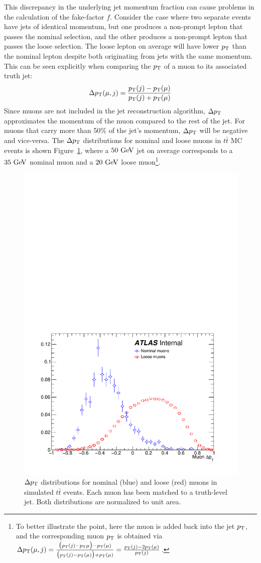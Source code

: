 This discrepancy in the underlying jet momentum fraction can cause problems in the calculation of the fake-factor $f$.
Consider the case where two separate events have jets of identical momentum, but one produces a non-prompt lepton that passes the nominal selection, and the other produces a non-prompt lepton that passes the loose selection.
The loose lepton on average will have lower $p_{\mathrm{T}}$ than the nominal lepton despite both originating from jets with the same momentum.
This can be seen explicitly when comparing the $p_{\mathrm{T}}$ of a muon to its associated truth jet:
\begin{equation}
\Delta\pt(\mu,j) = \frac{\pt(j)-\pt(\mu)}{\pt(j)+\pt(\mu)}
\label{eq:ssww13tev_ff_deltapt}
\end{equation}
Since muons are not included in the jet reconstruction algorithm, $\Delta p_{\mathrm{T}}$ approximates the momentum of the muon compared to the rest of the jet.
For muons that carry more than 50\% of the jet's momentum, $\Delta p_{\mathrm{T}}$ will be negative and vice-versa.
The $\Delta p_{\mathrm{T}}$ distributions for nominal and loose muons in $t\bar{t}$ MC events is shown Figure~\ref{fig:ssww13tev_ff_deltapt}, where a $50\gev$ jet on average corresponds to a $35\gev$ nominal muon and a $20\gev$ loose muon\footnote{To better illustrate the point, here the muon is added back into the jet $p_{\mathrm{T}}$, and the corresponding muon $p_{\mathrm{T}}$ is obtained via $\Delta p_{\mathrm{T}}(\mu,j) = \frac{\big(p_{\mathrm{T}}(j)-p_{\mathrm{T}}{\mu}\big)-p_{\mathrm{T}}(\mu)}{\big(p_{\mathrm{T}}(j)-p_{\mathrm{T}}(\mu)\big)+p_{\mathrm{T}}(\mu)} = \frac{p_{\mathrm{T}}(j)-2p_{\mathrm{T}}(\mu)}{p_{\mathrm{T}}(j)}$.}.

\begin{figure}[htbp]
  \centering
  \includegraphics[width=.6\textwidth]{figs/ssww_13tev/backgrounds/ff/deltapt_ttbar}
  \caption{$\Delta p_{\mathrm{T}}$ distributions for nominal (blue) and loose (red) muons in simulated $t\bar{t}$ events.  Each muon has been matched to a truth-level jet.  Both distributions are normalized to unit area.}
  \label{fig:ssww13tev_ff_deltapt}
\end{figure}

